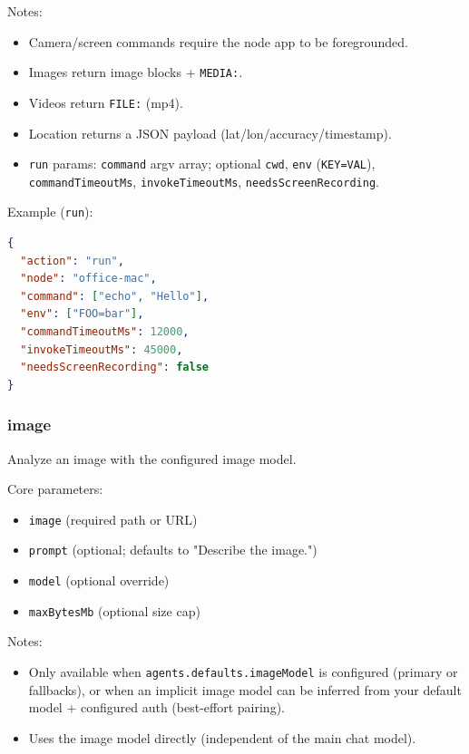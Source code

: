 Notes:

\begin{itemize}
  \item Camera/screen commands require the node app to be foregrounded.
  \item Images return image blocks + \texttt{MEDIA:}.
  \item Videos return \texttt{FILE:} (mp4).
  \item Location returns a JSON payload (lat/lon/accuracy/timestamp).
  \item \texttt{run} params: \texttt{command} argv array; optional \texttt{cwd}, \texttt{env} (\texttt{KEY=VAL}), \texttt{commandTimeoutMs}, \texttt{invokeTimeoutMs}, \texttt{needsScreenRecording}.
\end{itemize}


Example (\texttt{run}):

\begin{lstlisting}[language=json]
{
  "action": "run",
  "node": "office-mac",
  "command": ["echo", "Hello"],
  "env": ["FOO=bar"],
  "commandTimeoutMs": 12000,
  "invokeTimeoutMs": 45000,
  "needsScreenRecording": false
}
\end{lstlisting}


\subsubsection{image}


Analyze an image with the configured image model.

Core parameters:

\begin{itemize}
  \item \texttt{image} (required path or URL)
  \item \texttt{prompt} (optional; defaults to "Describe the image.")
  \item \texttt{model} (optional override)
  \item \texttt{maxBytesMb} (optional size cap)
\end{itemize}


Notes:

\begin{itemize}
  \item Only available when \texttt{agents.defaults.imageModel} is configured (primary or fallbacks), or when an implicit image model can be inferred from your default model + configured auth (best-effort pairing).
  \item Uses the image model directly (independent of the main chat model).
\end{itemize}


